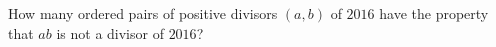 How many ordered pairs of positive divisors $(a,b)$ of $2016$ have the property that $ab$ is not a divisor of $2016$?
